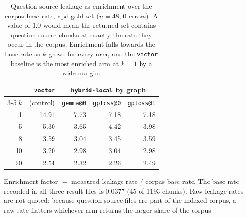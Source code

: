 \begin{table}[htbp]
  \centering
  \caption{Question-source leakage as enrichment over the corpus base rate, apd gold set
    ($n=48$, 0 errors). A value of 1.0 would mean the returned set contains question-source chunks
    at exactly the rate they occur in the corpus. Enrichment falls towards the base rate as $k$
    grows for every arm, and the \texttt{vector} baseline is the most enriched arm at $k=1$ by a
    wide margin.}
  \label{tab:retrieval-leakage}
  \begin{tabular}{rrrrr}
    \toprule
    & \texttt{vector} & \multicolumn{3}{c}{\texttt{hybrid-local} by graph} \\
    \cmidrule(lr){3-5}
    $k$ & (control) & \texttt{gemma@0} & \texttt{gptoss@0} & \texttt{gptoss@1} \\
    \midrule
     1 & 14.91 & 7.73 & 7.18 & 7.18 \\
     5 &  5.30 & 3.65 & 4.42 & 3.98 \\
     8 &  3.59 & 3.04 & 3.45 & 3.59 \\
    10 &  3.20 & 2.98 & 3.04 & 2.98 \\
    20 &  2.54 & 2.32 & 2.26 & 2.49 \\
    \bottomrule
  \end{tabular}

  \vspace{0.5em}
  \footnotesize
  Enrichment factor $=$ measured leakage rate $/$ corpus base rate. The base rate recorded in all
  three result files is $0.0377$ (45 of 1193 chunks). Raw leakage rates are not quoted: because
  question-source files are part of the indexed corpus, a raw rate flatters whichever arm returns
  the larger share of the corpus.
\end{table}
